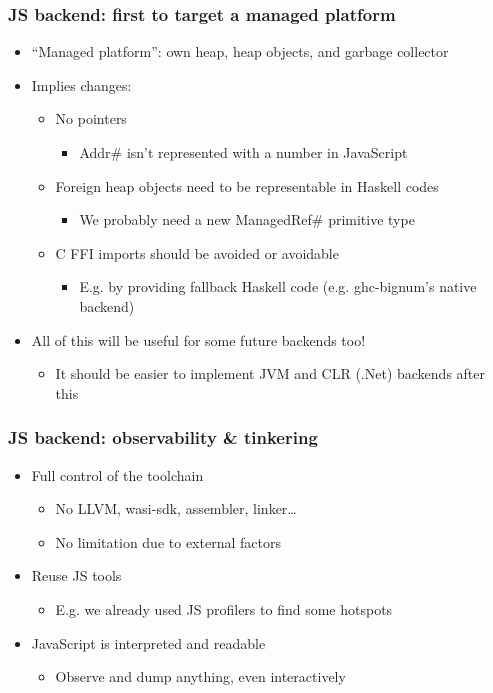 \documentclass{beamer}
\begin{document}
\begin{frame}
\frametitle{JS backend: first to target a managed platform}
\begin{itemize}
\item “Managed platform”: own heap, heap objects, and garbage collector
\item Implies changes:
\begin{itemize}
\item No pointers
\begin{itemize}
\item Addr\# isn’t represented with a number in JavaScript
\end{itemize}
\item Foreign heap objects need to be representable in Haskell codes
\begin{itemize}
\item We probably need a new ManagedRef\# primitive type
\end{itemize}
\item C FFI imports should be avoided or avoidable
\begin{itemize}
\item E.g. by providing fallback Haskell code (e.g. ghc-bignum’s native backend)
\end{itemize}
\end{itemize}
\item All of this will be useful for some future backends too!
\begin{itemize}
\item It should be easier to implement JVM and CLR (.Net) backends after this
\end{itemize}
\end{itemize}
\end{frame}


\begin{frame}
\frametitle{JS backend: observability \& tinkering}

\begin{itemize}
\item Full control of the toolchain 
\begin{itemize}
\item No LLVM, wasi-sdk, assembler, linker…
\item No limitation due to external factors
\end{itemize}
\item Reuse JS tools
\begin{itemize}
\item E.g. we already used JS profilers to find some hotspots
\end{itemize}
\item JavaScript is interpreted and readable
\begin{itemize}
\item Observe and dump anything, even interactively
\end{itemize}
\end{itemize}
\end{frame}
\end{document}
